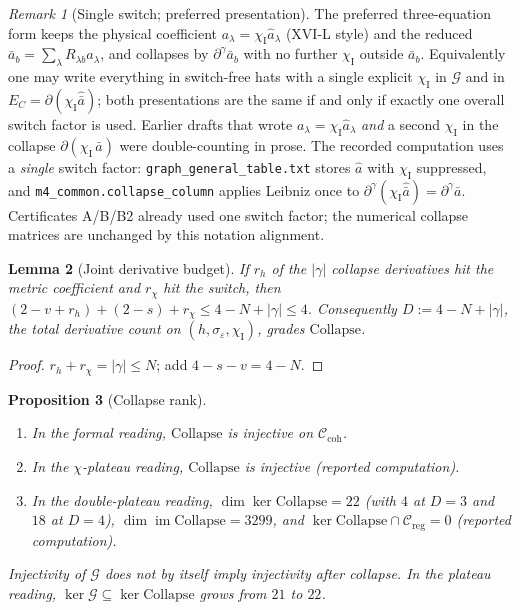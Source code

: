 \documentclass{article}
\newtheorem{proposition}{Proposition}
\newtheorem{lemma}[proposition]{Lemma}
\theoremstyle{remark}
\newtheorem{remark}[proposition]{Remark}
\newcommand{\sigeps}{\sigma_\varepsilon}
\newcommand{\chiI}{\chi_{\mathrm I}}
\newcommand{\Ccoh}{\mathcal C_{\mathrm{coh}}}
\newcommand{\Creg}{\mathcal C_{\mathrm{reg}}}
\newcommand{\Coll}{\mathrm{Collapse}}
\begin{document}
\begin{remark}[Single switch; preferred presentation]
\label{rem:singleswitch}
The preferred three-equation form keeps the physical coefficient $a_\lambda=\chiI\hat a_\lambda$ (XVI-L style) and the reduced $\bar a_b=\sum_\lambda R_{\lambda b}a_\lambda$, and collapses by $\partial^\gamma\bar a_b$ with no further $\chiI$ outside $\bar a_b$.
Equivalently one may write everything in switch-free hats with a single explicit $\chiI$ in $\mathcal G$ and in $E_C=\partial(\chiI\hat{\bar a})$; both presentations are the same if and only if exactly one overall switch factor is used.
Earlier drafts that wrote $a_\lambda=\chiI\hat a_\lambda$ \emph{and} a second $\chiI$ in the collapse $\partial(\chiI\,\bar a)$ were double-counting in prose.
The recorded computation uses a \emph{single} switch factor: \texttt{graph\_general\_table.txt} stores $\hat a$ with $\chiI$ suppressed, and \texttt{m4\_common.collapse\_column} applies Leibniz once to $\partial^\gamma(\chiI\hat{\bar a})=\partial^\gamma\bar a$.
Certificates A/B/B2 already used one switch factor; the numerical collapse matrices are unchanged by this notation alignment.
\end{remark}

\begin{lemma}[Joint derivative budget]
\label{lem:joint}
If $r_h$ of the $|\gamma|$ collapse derivatives hit the metric coefficient and $r_\chi$ hit the switch, then $(2-v+r_h)+(2-s)+r_\chi\le4-N+|\gamma|\le4$.
Consequently $D:=4-N+|\gamma|$, the total derivative count on $(h,\sigeps,\chiI)$, grades $\Coll$.
\end{lemma}

\begin{proof}
$r_h+r_\chi=|\gamma|\le N$; add $4-s-v=4-N$.
\end{proof}

\begin{proposition}[Collapse rank]
\label{prop:collinj}
\begin{enumerate}
\item In the formal reading, $\Coll$ is injective on $\Ccoh$.
\item In the $\chi$-plateau reading, $\Coll$ is injective (reported computation).
\item In the double-plateau reading, $\dim\ker\Coll=22$ (with $4$ at $D=3$ and $18$ at $D=4$), $\dim\operatorname{im}\Coll=3299$, and $\ker\Coll\cap\Creg=0$ (reported computation).
\end{enumerate}
Injectivity of $\mathcal G$ does not by itself imply injectivity after collapse.
In the plateau reading, $\ker\mathcal G\subseteq\ker\Coll$ grows from $21$ to $22$.
\end{proposition}
\end{document}
